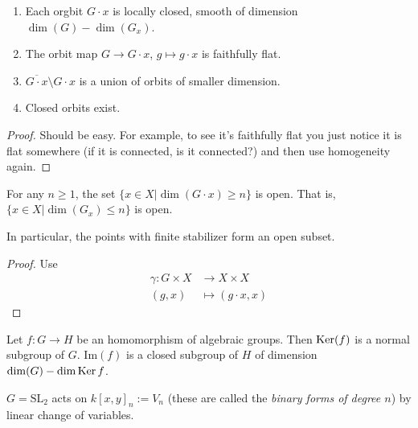 \begin{proposition}
\label{proposition-properties-of-orbit}
\begin{enumerate}
\item Each orgbit $G\cdot x$ is locally closed, smooth of dimension
$\dim(G)-\dim(G_x)$.
\item The orbit map $G \to G\cdot x$, $g \mapsto  g\cdot x$ is faithfully flat.
\item $\overline{G\cdot x}\setminus G\cdot x$ is a union of orbits of smaller
dimension.
\item Closed orbits exist.
\end{enumerate}
\end{proposition}

\begin{proof}
Should be easy.
For example, to see it's faithfully flat you just notice it is flat somewhere
(if it is connected, is it connected?) and then use homogeneity again.
\end{proof}

\begin{proposition}
\label{proposition-bound-on-dimension-of-orbit-gives-open-set}
For any $n \geq 1$, the set $\{x \in X|\dim(G\cdot x)\geq n\}$ is open. That is,
$\{x \in X|\dim(G_x)\leq n\}$ is open.

In particular, the points with finite stabilizer form an open subset.
\end{proposition}

\begin{proof}
Use
\begin{align*}
\gamma: G \times X &\longrightarrow X\times X \\
(g,x) &\longmapsto (g\cdot x,x)
\end{align*}
\end{proof}

\begin{lemma}
\label{lemma-homomorphism-of-algebraic-groups}
Let $f:G \to H$ be an homomorphism of algebraic groups. Then $\mathop{\mathrm{Ker}} (f)$ is a
normal subgroup of $G$. $\text{Im}(f)$ is a
closed subgroup of $H$ of dimension $\dim(G)-\dim \mathop{\mathrm{Ker}} f$.
\end{lemma}

\begin{example}
\label{example-SL2-acts-on-homogeneous-polynomials}
$G=\text{SL}_2$ acts on $k[x,y]_n:=V_n$ (these are called the {\it binary forms 
of degree $n$}) by linear change of variables.
\end{example}

